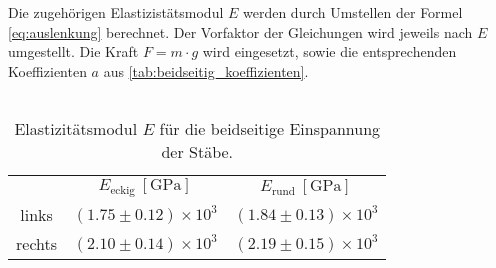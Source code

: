 Die zugehörigen Elastizistätsmodul $E$ werden durch Umstellen der Formel \eqref{eq:auslenkung} berechnet. Der Vorfaktor der Gleichungen %
wird jeweils nach $E$ umgestellt. Die Kraft $F = m \cdot g$ wird eingesetzt, sowie die entsprechenden Koeffizienten $a$ aus \autoref{tab:beidseitig_koeffizienten}.\\
\\
\begin{table}
    \centering
    \caption{Elastizitätsmodul $E$ für die beidseitige Einspannung der Stäbe.}
    \label{tab:beidseitig_E}
    \begin{tabular}{|c|c c|}
        \toprule
        & $E_{\text{eckig}}\:[\unit{\giga\pascal}]$ & $E_{\text{rund}}\:[\unit{\giga\pascal}]$\\
        \cmidrule(lr){2-3}
        links & $(1.75 \pm 0.12)\times 10^3$ & $(1.84 \pm 0.13)\times 10^3$\\
        rechts & $(2.10 \pm 0.14)\times 10^3$ & $(2.19 \pm 0.15)\times 10^3$\\
        \bottomrule
    \end{tabular}
\end{table}
\newpage
